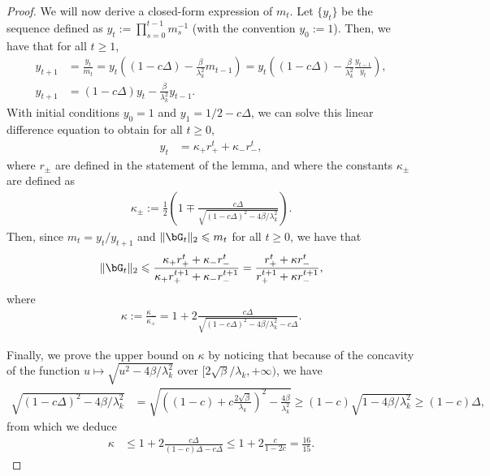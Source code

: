\documentclass{article}
\theoremstyle{plain}
\theoremstyle{definition}
\theoremstyle{remark}
\begin{document}
\begin{proof}
  We will now derive a closed-form expression of $m_t$. Let $\{y_t\}$ be the sequence defined as $y_t := \prod_{s=0}^{t-1} m_s^{-1}$ (with the convention $y_0 := 1$). Then, we have that for all $t\geqslant 1$,
  \begin{align*}
    y_{t+1} & =  \frac{y_t}{m_{t}} = y_t \left((1-c\Delta) - \frac{\beta}{\lambda_k^2} m_{t-1}\right) = y_t \left((1-c\Delta) - \frac{\beta}{\lambda_k^2} \frac{y_{t-1}}{y_t}\right), \\
    y_{t+1} & = (1 - c\Delta) y_t - \frac{\beta}{\lambda_k^2} y_{t-1}.
  \end{align*}
  With initial conditions $y_0 = 1$ and $y_1 = 1/2 - c\Delta$, we can solve this linear difference equation to obtain for all $t\geqslant 0$,
  \begin{align*}
    y_t & = \kappa_+ r_+^t + \kappa_- r_-^t,
  \end{align*}
  where $r_\pm$ are defined in the statement of the lemma, and where the constants $\kappa_\pm$ are defined as
  \begin{align*}
    \kappa_\pm := \frac{1}{2}\left( 1 \mp \frac{c\Delta}{\sqrt{(1-c\Delta)^2 - 4\beta/\lambda_k^2}}\right).
  \end{align*}
  Then, since $m_t = y_{t}/y_{t+1}$ and $\Vert\bG_t \Vert_2 \leqslant m_t$ for all $t\geqslant 0$, we have that
  \begin{align*}
   \Vert\bG_t\Vert_2 \leqslant \frac{\kappa_+ r_+^t + \kappa_- r_-^t}{\kappa_+ r_+^{t+1} + \kappa_- r_-^{t+1}} = \frac{r_+^t + \kappa r_-^t}{r_+^{t+1} + \kappa r_-^{t+1}},
  \end{align*}
  where 
  \begin{align*}
    \kappa := \frac{\kappa_-}{\kappa_+} = 1 + 2\frac{c\Delta}{\sqrt{(1-c\Delta)^2 - 4\beta/\lambda_k^2} - c\Delta}.
  \end{align*}

  Finally, we prove the upper bound on $\kappa$ by noticing that because of the concavity of the function $u\mapsto \sqrt{u^2 - 4\beta/\lambda_k^2}$ over $[2\sqrt{\beta}/\lambda_k, +\infty)$, we have
  \begin{align*}
    \sqrt{(1-c\Delta)^2 - 4\beta/\lambda_k^2} & = \sqrt{\left((1-c) + c\frac{2\sqrt{\beta}}{\lambda_k}\right)^2 - \frac{4\beta}{\lambda_k^2}} \geqslant (1-c) \sqrt{1 - 4\beta/\lambda_k^2} \geqslant (1-c) \Delta,
  \end{align*}
  from which we deduce
  \begin{align*}
    \kappa & \leqslant 1 + 2\frac{c\Delta}{(1-c)\Delta - c\Delta} \leqslant 1 + 2\frac{c}{1 - 2c} = \frac{16}{15}.
  \end{align*}

\end{proof}
\end{document}
